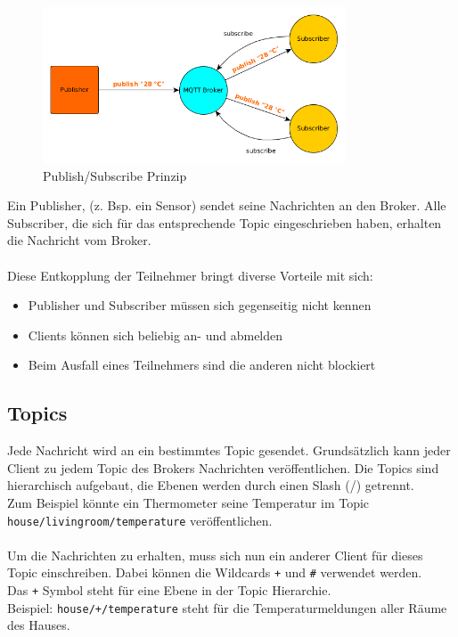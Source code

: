 \begin{figure}[H]
	\centering
		\includegraphics[width=0.8\textwidth]{diag/pub_sub.png}
	\caption{\label{fig:pub_sub}Publish/Subscribe Prinzip}
\end{figure}


\par
Ein Publisher, (z. Bsp. ein Sensor) sendet seine Nachrichten an den Broker. Alle Subscriber, die sich für das entsprechende Topic eingeschrieben haben, erhalten die Nachricht vom Broker. 
\\ \\
Diese Entkopplung der Teilnehmer bringt diverse Vorteile mit sich:

\begin{itemize}
\item Publisher und Subscriber müssen sich gegenseitig nicht kennen
\item Clients können sich beliebig an- und abmelden
\item Beim Ausfall eines Teilnehmers sind die anderen nicht blockiert
\end{itemize}

\subsection{Topics}
Jede Nachricht wird an ein bestimmtes Topic gesendet. Grundsätzlich kann jeder Client zu jedem Topic des Brokers Nachrichten veröffentlichen. Die Topics sind hierarchisch aufgebaut, die Ebenen werden durch einen Slash (/) getrennt.\\
Zum Beispiel könnte ein Thermometer seine Temperatur im Topic \texttt{house/livingroom/temperature} veröffentlichen.\\ \\
Um die Nachrichten zu erhalten, muss sich nun ein anderer Client für dieses Topic einschreiben. Dabei können die Wildcards \texttt{+} und \texttt{\#} verwendet werden.\\
Das \texttt{+} Symbol steht für eine Ebene in der Topic Hierarchie.\\
Beispiel: \texttt{house/+/temperature} steht für die Temperaturmeldungen aller Räume des Hauses.

